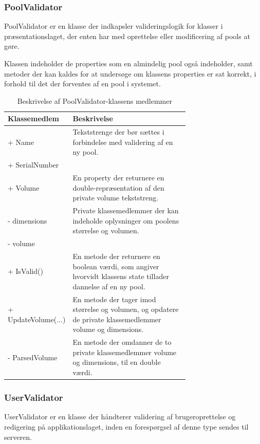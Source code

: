 \subsubsection{PoolValidator}
PoolValidator er en klasse der indkapsler valideringslogik for klasser i præsentationslaget, der enten har med oprettelse eller modificering af pools at gøre.

Klassen indeholder de properties som en almindelig pool også indeholder, samt metoder der kan kaldes for at undersøge om klassens properties er sat korrekt, i forhold til det der forventes af en pool i systemet.

\begin{table}
	\centering
	\begin{tabular}{| l | p{0.7\linewidth} |}
		\toprule
		\textbf{Klassemedlem}	& \textbf{Beskrivelse} \\
		\midrule
		+ Name				& Tekststrenge der bør sættes i forbindelse med validering af en ny pool.	\\
		+ SerialNumber			& 	\\\hline
		+ Volume 				& En property der returnere en double-repræsentation af den private volume tekststreng. \\\hline
		- dimensions 			& Private klassemedlemmer der kan indeholde oplysninger om poolens størrelse og volumen. \\
		- volume 				& 	\\\hline
		+ IsValid()					& En metode der returnere en boolean værdi, som angiver hvorvidt klassens state tillader dannelse af en ny pool. \\\hline
		+ UpdateVolume(...)						& En metode der tager imod størrelse og volumen, og opdatere de private klassemedlemmer volume og dimensions. \\\hline
		- ParsedVolume					& En metode der omdanner de to private klassemedlemmer volume og dimensions, til en double værdi. \\
		\bottomrule
		\end{tabular}
	\caption{Beskrivelse af PoolValidator-klassens medlemmer}
	\label{tab:table_design_poolvalidator}	
\end{table}

\subsubsection{UserValidator}
UserValidator er en klasse der håndterer validering af brugeroprettelse og redigering på applikationslaget, inden en forespørgsel af denne type sendes til serveren.

